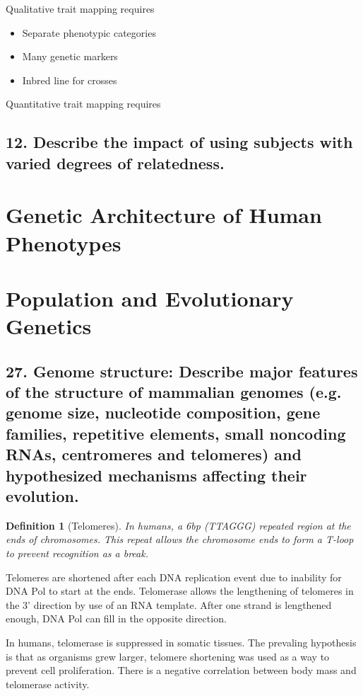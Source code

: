 \documentclass{tufte-handout}
\theoremstyle{noparens}
\newtheorem*{define}{Definition}
\begin{document}
Qualitative trait mapping requires

\begin{itemize}
\item Separate phenotypic categories
\item Many genetic markers
\item Inbred line for crosses
\end{itemize}

Quantitative trait mapping requires

\newpage

\subsection{12. 
Describe the impact of using subjects with varied degrees of relatedness.}

\newpage
\section{Genetic Architecture of Human Phenotypes}\label{sec:genarch}

\section{Population and Evolutionary Genetics}\label{sec:popgen}

\subsection{27.
Genome structure: Describe major features of the structure of mammalian genomes (e.g. 
genome size, nucleotide composition, gene families, repetitive elements, small noncoding RNAs, centromeres and telomeres) and hypothesized mechanisms affecting their evolution.}

\begin{define}[Telomeres]
In humans, a 6bp (TTAGGG) repeated region at the ends of chromosomes. This repeat allows the chromosome ends to form a T-loop to prevent recognition as a break.
\end{define}

Telomeres are shortened after each DNA replication event due to inability for DNA Pol to start at the ends. Telomerase allows the lengthening of telomeres in the 3' direction by use of an RNA template. After one strand is lengthened enough, DNA Pol can fill in the opposite direction.

In humans, telomerase is suppressed in somatic tissues. The prevaling hypothesis is that as organisms grew larger, telomere shortening was used as a way to prevent cell proliferation. There is a negative correlation between body mass and telomerase activity.
\end{document}
